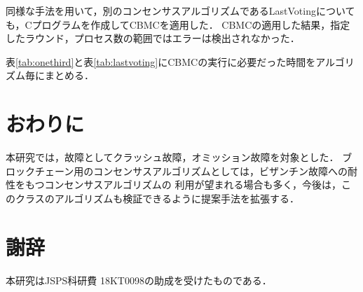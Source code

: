 \documentclass[technicalreport]{ieicej}
\theoremstyle{plain}
\begin{document}
同様な手法を用いて，別のコンセンサスアルゴリズムであるLastVoting\cite{HOjournal}についても，Cプログラムを作成してCBMCを適用した．
CBMCの適用した結果，指定したラウンド，プロセス数の範囲ではエラーは検出されなかった．

表\ref{tab:onethird}と表\ref{tab:lastvoting}にCBMCの実行に必要だった時間をアルゴリズム毎にまとめる．



\section{おわりに}\label{sec:conclusion}

本研究では，故障としてクラッシュ故障，オミッション故障を対象とした．
ブロックチェーン用のコンセンサスアルゴリズムとしては，ビザンチン故障への耐性をもつコンセンサスアルゴリズムの
利用が望まれる場合も多く，今後は，このクラスのアルゴリズムも検証できるように提案手法を拡張する．

\section*{謝辞}
本研究はJSPS科研費 18KT0098の助成を受けたものである．





\end{document}
